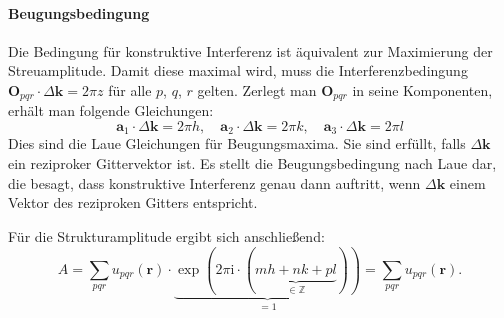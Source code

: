 \paragraph{Beugungsbedingung}
Die Bedingung für konstruktive Interferenz ist äquivalent zur Maximierung der Streuamplitude.
Damit diese maximal wird, muss die Interferenzbedingung $\mathbf{O}_{pqr}\cdot\Delta \mathbf{k} =2\pi z$
für alle $p$, $q$, $r$ gelten.
Zerlegt man $\mathbf{O}_{pqr}$ in seine Komponenten, erhält man folgende Gleichungen:
\begin{equation}
    \mathbf{a}_{1}\cdot\Delta \mathbf{k} = 2\pi h, \quad
    \mathbf{a}_{2}\cdot\Delta \mathbf{k} = 2\pi k, \quad
    \mathbf{a}_{3}\cdot\Delta \mathbf{k} = 2\pi l
    \label{eq:lauebedingung}
\end{equation}
Dies sind die Laue Gleichungen für Beugungsmaxima.
Sie sind erfüllt, falls $\Delta \mathbf{k}$ ein reziproker Gittervektor ist.
Es stellt die Beugungsbedingung nach Laue dar, die besagt, dass konstruktive Interferenz genau dann auftritt,
wenn $\Delta \mathbf{k}$ einem Vektor des reziproken Gitters entspricht.\autocite[125]{Ashcroft}

Für die Strukturamplitude ergibt sich anschließend:
\begin{equation}
    A = \sum_{pqr} u_{pqr}(\mathbf{r}) \cdot\underbrace{ \exp(2\pi \mathrm{i}
    \cdot(\underbrace{ mh+nk+pl }_{ \in\mathbb{Z} })) }_{ =1 }
    = \sum_{pqr} u_{pqr}(\mathbf{r}).
    \label{eq:strukturamplitude}
\end{equation}

